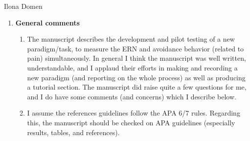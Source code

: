 \documentclass[twocolumn, serif, authordate, review]{jote-article}
\begin{document}
\noindent %
\begin{paracol}{2}
\begin{reviewend}{Ilona Domen}
    \begin{enumerate}[label=\textbf{\arabic*}), start=0]
    \item \textbf{General comments}
        \begin{enumerate}
            \item The manuscript describes the development and pilot testing of a new paradigm/task, to measure the ERN and avoidance behavior (related to pain) simultaneously. In general I think the manuscript was well written, understandable, and I applaud their efforts in making and recording a new paradigm (and reporting on the whole process) as well as producing a tutorial section. The manuscript did raise quite a few questions for me, and I do have some comments (and concerns) which I describe below. 
            \item I assume the references guidelines follow the APA 6/7 rules. Regarding this, the manuscript should be checked on APA guidelines (especially results, tables, and references).
        \end{enumerate}


\end{enumerate}
\end{reviewend}
\end{paracol}
\end{document}
